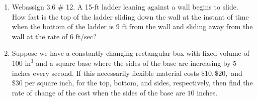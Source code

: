 \documentclass[reqno,psamsfonts]{amsart}
\theoremstyle{definition}
\theoremstyle{remark}
\numberwithin{equation}{section}
\begin{document}
\begin{enumerate}
\item Webassign 3.6 \# 12. A 15-ft ladder leaning against a wall begins to slide. How fast is the top of the ladder sliding down the wall at the instant of time when the bottom of the ladder is 9 ft from the wall and sliding away from the wall at the rate of 6 ft/sec?
\\
\begin{center}
\end{center}
\item Suppose we have a constantly changing rectangular box with fixed volume of $100\text{ in}^3$ and a square base where the sides of the base are increasing by $5$ inches every second. If this necessarily flexible material costs $\$10, \$20,$ and $\$30$ per square inch, for the top, bottom, and sides, respectively, then find the rate of change of the cost when the sides of the base are $10$ inches.

\end{enumerate}
\end{document}
